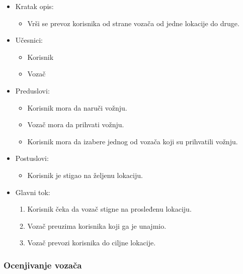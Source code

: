 \begin{itemize}
	\item Kratak opis:
		\begin{itemize}
			\item Vrši se prevoz korisnika od strane vozača od jedne lokacije do druge.
		\end{itemize}
	\item Učesnici:
		\begin{itemize}
		    \item Korisnik
		    \item Vozač
		\end{itemize}				
	\item Preduslovi:
		\begin{itemize}
		    \item Korisnik mora da naruči vožnju.
		    \item Vozač mora da prihvati vožnju.
		    \item Korisnik mora da izabere jednog od vozača koji su prihvatili vožnju.
		\end{itemize}
	\item Postuslovi:
		\begin{itemize}
			\item Korisnik je stigao na željenu lokaciju.
		\end{itemize}	
	\item Glavni tok:
		\begin{enumerate}
		    \item Korisnik čeka da vozač stigne na prosleđenu lokaciju.
		    \item Vozač preuzima korisnika koji ga je unajmio.  
		    \item Vozač prevozi korisnika do ciljne lokacije.
		\end{enumerate}
\end{itemize}


\subsubsection{\bfseries Ocenjivanje vozača}

